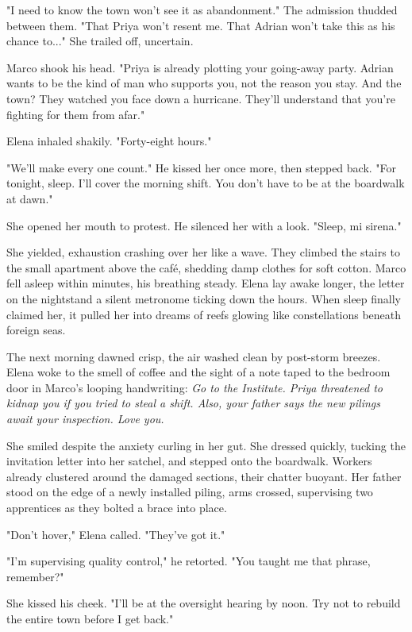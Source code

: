 "I need to know the town won't see it as abandonment." The admission thudded between them. "That Priya won't resent me. That Adrian won't take this as his chance to..." She trailed off, uncertain.

Marco shook his head. "Priya is already plotting your going-away party. Adrian wants to be the kind of man who supports you, not the reason you stay. And the town? They watched you face down a hurricane. They'll understand that you're fighting for them from afar."

Elena inhaled shakily. "Forty-eight hours."

"We'll make every one count." He kissed her once more, then stepped back. "For tonight, sleep. I'll cover the morning shift. You don't have to be at the boardwalk at dawn."

She opened her mouth to protest. He silenced her with a look. "Sleep, mi sirena."

She yielded, exhaustion crashing over her like a wave. They climbed the stairs to the small apartment above the café, shedding damp clothes for soft cotton. Marco fell asleep within minutes, his breathing steady. Elena lay awake longer, the letter on the nightstand a silent metronome ticking down the hours. When sleep finally claimed her, it pulled her into dreams of reefs glowing like constellations beneath foreign seas.

\bigskip

The next morning dawned crisp, the air washed clean by post-storm breezes. Elena woke to the smell of coffee and the sight of a note taped to the bedroom door in Marco's looping handwriting: \textit{Go to the Institute. Priya threatened to kidnap you if you tried to steal a shift. Also, your father says the new pilings await your inspection. Love you.}

She smiled despite the anxiety curling in her gut. She dressed quickly, tucking the invitation letter into her satchel, and stepped onto the boardwalk. Workers already clustered around the damaged sections, their chatter buoyant. Her father stood on the edge of a newly installed piling, arms crossed, supervising two apprentices as they bolted a brace into place.

"Don't hover," Elena called. "They've got it."

"I'm supervising quality control," he retorted. "You taught me that phrase, remember?"

She kissed his cheek. "I'll be at the oversight hearing by noon. Try not to rebuild the entire town before I get back."

